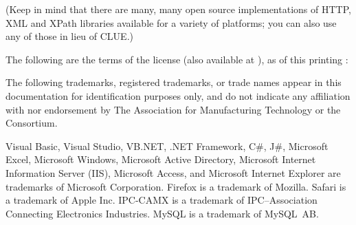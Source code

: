 (Keep in mind that there are many, many open source implementations of
HTTP, XML and XPath libraries available for a variety of platforms; you
can also use any of those in lieu of CLUE.)

The following are the terms of the license (also available at \website),
as of this printing
:


The following trademarks, registered trademarks, or trade names appear
in this documentation for identification purposes only, and do not
indicate any affiliation with nor endorsement by The Association for
Manufacturing Technology or the \mtc{} Consortium.

Visual Basic, Visual Studio, VB.NET, .NET Framework, 
C\#, J\#, Microsoft Excel, Microsoft Windows, Microsoft Active Directory,
Microsoft Internet Information Server (IIS), Microsoft Access,
and Microsoft Internet Explorer are trademarks of Microsoft Corporation.  
Firefox is a trademark of Mozilla.  Safari is a trademark of Apple Inc. 
IPC-CAMX is a trademark of IPC--Association Connecting Electronics Industries.
MySQL is a trademark of MySQL~AB.

